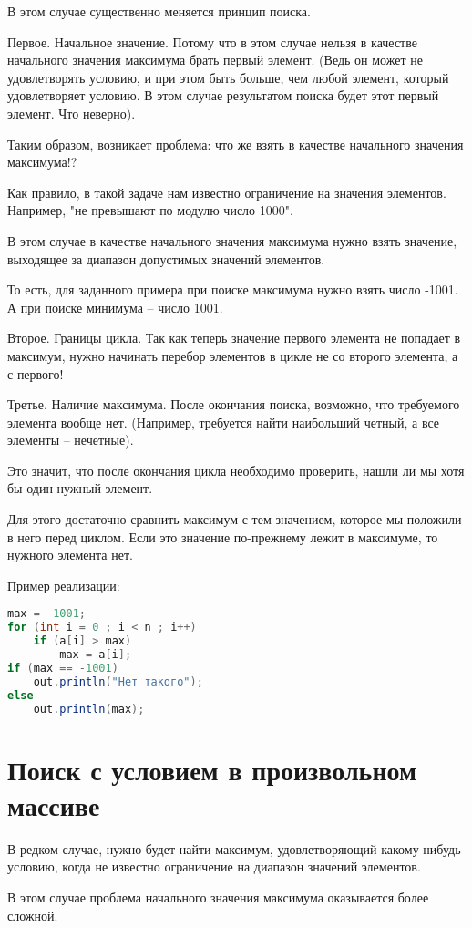 \documentclass[a4paper]{article}
\begin{document}
В этом случае существенно меняется принцип поиска.

Первое. Начальное значение.
Потому что в этом случае нельзя в качестве начального значения максимума брать первый элемент.
(Ведь он может не удовлетворять условию, и при этом быть больше, чем любой элемент, который удовлетворяет условию. В этом случае результатом поиска будет этот первый элемент. Что неверно).

Таким образом, возникает проблема: что же взять в качестве начального значения максимума!?

Как правило, в такой задаче нам известно ограничение на значения элементов. Например, "не превышают по модулю число 1000".

В этом случае в качестве начального значения максимума нужно взять значение, выходящее за диапазон допустимых значений элементов.

То есть, для заданного примера при поиске максимума нужно взять число -1001.
А при поиске минимума -- число 1001.

Второе. Границы цикла.
Так как теперь значение первого элемента не попадает в максимум, нужно начинать перебор элементов в цикле не со второго элемента, а с первого!

Третье. Наличие максимума.
После окончания поиска, возможно, что требуемого элемента вообще нет.
(Например, требуется найти наибольший четный, а все элементы -- нечетные).

Это значит, что после окончания цикла необходимо проверить, нашли ли мы хотя бы один нужный элемент.

Для этого достаточно сравнить максимум с тем значением, которое мы положили в него перед циклом.
Если это значение по-прежнему лежит в максимуме, то нужного элемента нет.

Пример реализации:
\begin{lstlisting}[language=Java] 
 max = -1001;
for (int i = 0 ; i < n ; i++)
    if (a[i] > max)
        max = a[i];
if (max == -1001)
    out.println("Нет такого");
else
    out.println(max);
\end{lstlisting} 
\section{Поиск с условием в произвольном массиве}
В редком случае, нужно будет найти максимум, удовлетворяющий какому-нибудь условию, когда не известно ограничение на диапазон значений элементов.

В этом случае проблема начального значения максимума оказывается более сложной.
\end{document}
